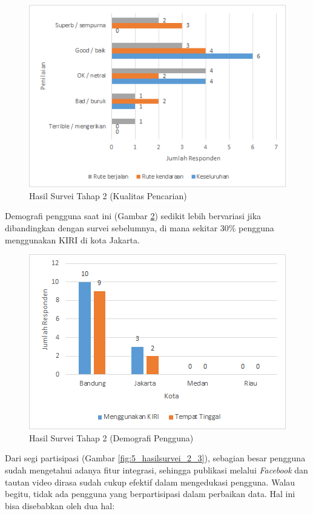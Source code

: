 \begin{figure}
	\centering
	\includegraphics[scale=0.75]{Gambar/5_hasilsurvei_2_1}
	\caption{Hasil Survei Tahap 2 (Kualitas Pencarian)} 
	\label{fig:5_hasilsurvei_2_1}
\end{figure}

Demografi pengguna saat ini (Gambar \ref{fig:5_hasilsurvei_2_2}) sedikit lebih bervariasi jika dibandingkan dengan survei sebelumnya, di mana sekitar 30\% pengguna menggunakan KIRI di kota Jakarta.

\begin{figure}
	\centering
	\includegraphics[scale=0.75]{Gambar/5_hasilsurvei_2_2}
	\caption{Hasil Survei Tahap 2 (Demografi Pengguna)} 
	\label{fig:5_hasilsurvei_2_2}
\end{figure}

Dari segi partisipasi (Gambar \ref{fig:5_hasilsurvei_2_3}), sebagian besar pengguna sudah mengetahui adanya fitur integrasi, sehingga publikasi melalui \textit{Facebook} dan tautan video dirasa sudah cukup efektif dalam mengedukasi pengguna. Walau begitu, tidak ada pengguna yang berpartisipasi dalam perbaikan data. Hal ini bisa disebabkan oleh dua hal:

